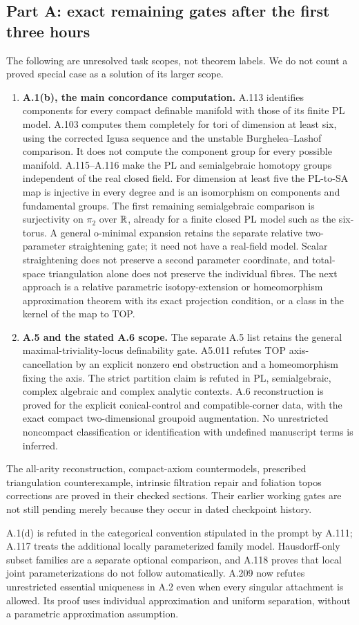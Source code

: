 \subsection*{Part A: exact remaining gates after the first three hours}
The following are unresolved task scopes, not theorem labels. We do not
count a proved special case as a solution of its larger scope.
\begin{enumerate}
\item \textbf{A.1(b), the main concordance computation.}
A.113 identifies components for every compact definable manifold with
those of its finite PL model. A.103 computes them completely for tori
of dimension at least six, using the corrected Igusa sequence and the
unstable Burghelea--Lashof comparison. It does not compute the component
group for every possible manifold. A.115--A.116 make the PL and
semialgebraic homotopy groups independent of the real closed field.
For dimension at least five the PL-to-SA map is injective in every
degree and is an isomorphism on components and fundamental groups.
The first remaining semialgebraic comparison is surjectivity on
$\pi_2$ over $\mathbb R$, already for a finite closed PL model such as the
six-torus. A general o-minimal expansion retains the separate relative
two-parameter straightening gate; it need not have a real-field model.
Scalar straightening does not preserve a second parameter coordinate,
and total-space triangulation alone does not preserve the individual
fibres. The next approach is a relative parametric isotopy-extension
or homeomorphism approximation theorem with its exact projection
condition, or a class in the kernel of the map to TOP.
\item \textbf{A.5 and the stated A.6 scope.}
The separate A.5 list retains the general maximal-triviality-locus
definability gate. A5.011 refutes TOP axis-cancellation by an explicit
nonzero end obstruction and a homeomorphism fixing the axis. The strict
partition claim is refuted in PL, semialgebraic, complex algebraic and
complex analytic contexts. A.6 reconstruction is proved for the
explicit conical-control and compatible-corner data, with the exact
compact two-dimensional groupoid augmentation. No unrestricted
noncompact classification or identification with undefined manuscript
terms is inferred.
\end{enumerate}
The all-arity reconstruction, compact-axiom countermodels, prescribed
triangulation counterexample, intrinsic filtration repair and foliation
topos corrections are proved in their checked sections. Their earlier
working gates are not still pending merely because they occur in dated
checkpoint history.

A.1(d) is refuted in the categorical convention stipulated in the prompt
by A.111; A.117 treats the additional locally parameterized family model.
Hausdorff-only subset families are a separate optional comparison, and
A.118 proves that local joint parameterizations do not follow automatically.
A.209 now refutes unrestricted essential uniqueness in A.2 even when every
singular attachment is allowed. Its proof uses individual approximation
and uniform separation, without a parametric approximation assumption.
